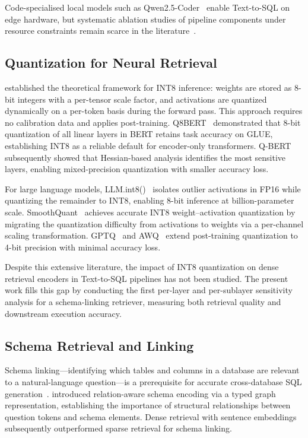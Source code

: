 Code-specialised local models such as Qwen2.5-Coder~\citep{hui2024qwen25coder}
enable Text-to-SQL on edge hardware, but systematic ablation studies of
pipeline components under resource constraints remain scarce in the
literature~\citep{liu2025survey}.

\subsection{Quantization for Neural Retrieval}

\citet{jacob2018quantization} established the theoretical framework for
INT8 inference: weights are stored as 8-bit integers with a per-tensor scale
factor, and activations are quantized dynamically on a per-token basis during
the forward pass.
This approach requires no calibration data and applies post-training.
Q8BERT~\citep{zafrir2019q8bert} demonstrated that 8-bit quantization of all
linear layers in BERT retains task accuracy on GLUE, establishing INT8 as a
reliable default for encoder-only transformers.
Q-BERT~\citep{shen2020qbert} subsequently showed that Hessian-based analysis
identifies the most sensitive layers, enabling mixed-precision quantization
with smaller accuracy loss.

For large language models, LLM.int8()~\citep{dettmers2022llmint8} isolates
outlier activations in FP16 while quantizing the remainder to INT8,
enabling 8-bit inference at billion-parameter scale.
SmoothQuant~\citep{xiao2023smoothquant} achieves accurate INT8
weight--activation quantization by migrating the quantization difficulty from
activations to weights via a per-channel scaling transformation.
GPTQ~\citep{dettmers2022gptq} and AWQ~\citep{lin2023awq} extend
post-training quantization to 4-bit precision with minimal accuracy loss.

Despite this extensive literature, the impact of INT8 quantization on
dense retrieval encoders in Text-to-SQL pipelines has not been studied.
The present work fills this gap by conducting the first
per-layer and per-sublayer sensitivity analysis for a schema-linking
retriever, measuring both retrieval quality and downstream execution accuracy.

\subsection{Schema Retrieval and Linking}

Schema linking---identifying which tables and columns in a database are
relevant to a natural-language question---is a prerequisite for accurate
cross-database SQL generation~\citep{lei2020schema}.
\citet{wang2020ratsql} introduced relation-aware schema encoding via a
typed graph representation, establishing the importance of structural
relationships between question tokens and schema elements.
Dense retrieval with sentence embeddings~\citep{reimers2019sbert}
subsequently outperformed sparse retrieval for schema linking.


